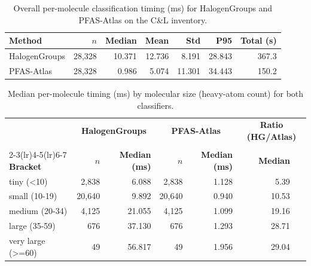 


\begin{table}[htbp]
\centering
\caption{Overall per-molecule classification timing (ms) for
  HalogenGroups and PFAS-Atlas on the C\&L inventory.}
\label{tab:clinventory_timing_overall}
\begin{tabular}{lrrrrrr}
\toprule
\rowcolor[HTML]{D6E4F5}\textbf{Method} & \textbf{$n$} & \textbf{Median} & \textbf{Mean} & \textbf{Std} & \textbf{P95} & \textbf{Total (s)} \\
\midrule
  \rowcolor[HTML]{FAEADE}HalogenGroups & 28,328 & 10.371 & 12.736 & 8.191 & 28.843 & 367.3 \\
  \rowcolor[HTML]{D6E4F5}PFAS-Atlas & 28,328 & 0.986 & 5.074 & 11.301 & 34.443 & 150.2 \\
\bottomrule
\end{tabular}
\end{table}

\begin{table}[htbp]
\centering
\caption{Median per-molecule timing (ms) by molecular size (heavy-atom count)
  for both classifiers.}
\label{tab:clinventory_timing_bracket}
\begin{tabular}{lrrrrrr}
\toprule
\rowcolor[HTML]{D6E4F5} & \multicolumn{2}{c}{\textbf{HalogenGroups}} & \multicolumn{2}{c}{\textbf{PFAS-Atlas}} & \multicolumn{2}{c}{\textbf{Ratio (HG/Atlas)}} \\\\
\cmidrule(lr){2-3}\cmidrule(lr){4-5}\cmidrule(lr){6-7}
\rowcolor[HTML]{D6E4F5}\textbf{Bracket} & \textbf{$n$} & \textbf{Median (ms)} & \textbf{$n$} & \textbf{Median (ms)} & \textbf{Median} & \\
\midrule
  \rowcolor[HTML]{FAEADE}tiny (<10) & 2,838 & 6.088 & 2,838 & 1.128 & 5.39 \\
  small (10-19) & 20,640 & 9.892 & 20,640 & 0.940 & 10.53 \\
  \rowcolor[HTML]{FAEADE}medium (20-34) & 4,125 & 21.055 & 4,125 & 1.099 & 19.16 \\
  large (35-59) & 676 & 37.130 & 676 & 1.293 & 28.71 \\
  \rowcolor[HTML]{FAEADE}very large (>=60) & 49 & 56.817 & 49 & 1.956 & 29.04 \\
\bottomrule
\end{tabular}
\end{table}

